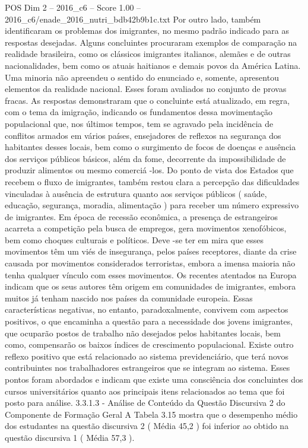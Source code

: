 \begin{textsample}{POS Dim 2 – 2016\_c6 – Score 1.00 – 2016\_c6/enade\_2016\_nutri\_bdb42b9b1c.txt}
Por outro lado, também identificaram os problemas dos imigrantes, no mesmo padrão indicado para as respostas desejadas.
Alguns concluintes procuraram exemplos de comparação na realidade brasileira, como os clássicos imigrantes italianos, alemães e de outras nacionalidades, bem como os atuais haitianos e demais povos da América Latina.
Uma minoria não apreendeu o sentido do enunciado e, somente, apresentou elementos da realidade nacional.
Esses foram avaliados no conjunto de provas fracas.
As respostas demonstraram que o concluinte está atualizado, em regra, com o tema da imigração, indicando os fundamentos dessa movimentação populacional que, nos últimos tempos, tem se agravado pela incidência de conflitos armados em vários países, ensejadores de reflexos na segurança dos habitantes desses locais, bem como o surgimento de focos de doenças e ausência dos serviços públicos básicos, além da fome, decorrente da impossibilidade de produzir alimentos ou mesmo comerciá -los.
Do ponto de vista dos Estados que recebem o fluxo de imigrantes, também restou clara a percepção das dificuldades vinculadas à ausência de estrutura quanto aos serviços públicos ( saúde, educação, segurança, moradia, alimentação ) para receber um número expressivo de imigrantes.
Em época de recessão econômica, a presença de estrangeiros acarreta a competição pela busca de empregos, gera movimentos xenofóbicos, bem como choques culturais e políticos.
Deve -se ter em mira que esses movimentos têm um viés de insegurança, pelos países receptores, diante da crise causada por movimentos considerados terroristas, embora a imensa maioria não tenha qualquer vínculo com esses movimentos.
Os recentes atentados na Europa indicam que os seus autores têm origem em comunidades de imigrantes, embora muitos já tenham nascido nos países da comunidade europeia.
Essas características negativas, no entanto, paradoxalmente, convivem com aspectos positivos, o que encaminha a questão para a necessidade dos jovens imigrantes, que ocuparão postos de trabalho não desejados pelos habitantes locais, bem como, compensarão os baixos índices de crescimento populacional.
Existe outro reflexo positivo que está relacionado ao sistema previdenciário, que terá novos contribuintes nos trabalhadores estrangeiros que se integram ao sistema.
Esses pontos foram abordados e indicam que existe uma consciência dos concluintes dos cursos universitários quanto aos principais itens relacionados ao tema que foi posto para análise. 3.3.1.3 - Análise de Conteúdo da Questão Discursiva 2 do Componente de Formação Geral A Tabela 3.15 mostra que o desempenho médio dos estudantes na questão discursiva 2 ( Média 45,2 ) foi inferior ao obtido na questão discursiva 1 ( Média 57,3 ).

\end{textsample}
